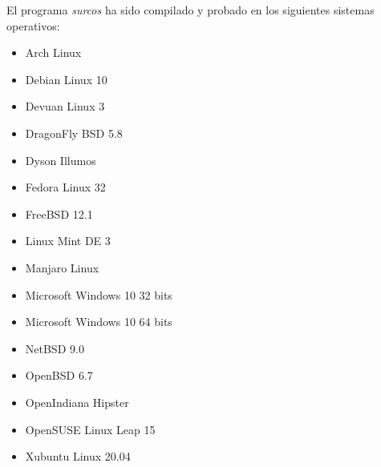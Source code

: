 El programa \emph{surcos} ha sido compilado y probado en los siguientes sistemas
operativos:
\begin{itemize}
\item Arch Linux
\item Debian Linux 10
\item Devuan Linux 3
\item DragonFly BSD 5.8
\item Dyson Illumos
\item Fedora Linux 32
\item FreeBSD 12.1
\item Linux Mint DE 3
\item Manjaro Linux
\item Microsoft Windows 10 32 bits
\item Microsoft Windows 10 64 bits
\item NetBSD 9.0
\item OpenBSD 6.7
\item OpenIndiana Hipster
\item OpenSUSE Linux Leap 15
\item Xubuntu Linux 20.04
\end{itemize}
